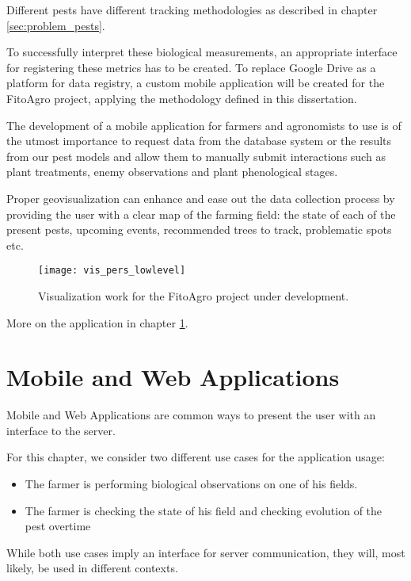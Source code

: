  Different pests have different tracking methodologies as described in chapter \ref{sec:problem_pests}. 

To successfully interpret these biological measurements, an appropriate interface for registering these metrics has to be created. To replace Google Drive as a platform for data registry, a custom mobile application will be created for the FitoAgro project, applying the methodology defined in this dissertation. 

The development of a mobile application for farmers and agronomists to use is of the utmost importance to request data from the database system or the results from our pest models and allow them to manually submit interactions such as plant treatments, enemy observations and plant phenological stages.

Proper geovisualization can enhance and ease out the data collection process by providing the user with a clear map of the farming field: the state of each of the present pests, upcoming events, recommended trees to track, problematic spots etc.

\begin{figure}[htbp]
  \centering
  \texttt{[image: vis\_pers\_lowlevel]}
  \caption{Visualization work for the FitoAgro project under development.}
  \label{fig:vis_pers_lowlevel}
\end{figure}

More on the application in chapter \ref{sec:mobile_web_app}.

\section{Mobile and Web Applications} %
\label{sec:mobile_web_app}

Mobile and Web Applications are common ways to present the user with an interface to the server.

For this chapter, we consider two different use cases for the application usage:

\begin{itemize}
	\item The farmer is performing biological observations on one of his fields.
	\item The farmer is checking the state of his field and checking evolution of the pest overtime
\end{itemize}

While both use cases imply an interface for server communication, they will, most likely, be used in different contexts.

